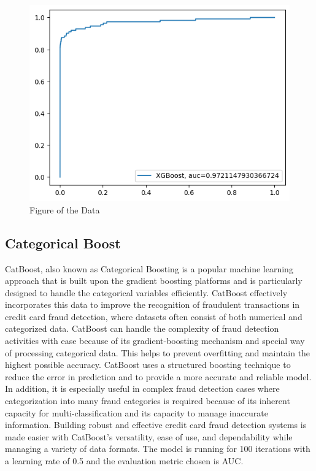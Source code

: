  \begin{figure}[ht]
    \centering
    \includegraphics[scale=0.7]{figures/XGBoost.png}
    \caption{Figure of the Data}
    \label{fig:Plot of the Data}
\end{figure}

\clearpage
 \subsection{Categorical Boost}

 CatBoost, also known as Categorical Boosting is a popular machine learning approach that is built upon the gradient boosting platforms and is particularly designed to handle the categorical variables efficiently. CatBoost effectively incorporates this data to improve the recognition of fraudulent transactions in credit card fraud detection, where datasets often consist of both numerical and categorized data. CatBoost can handle the complexity of fraud detection activities with ease because of its gradient-boosting mechanism and special way of processing categorical data. This helps to prevent overfitting and maintain the highest possible accuracy. CatBoost uses a structured boosting technique to reduce the error in prediction and to provide a more accurate and reliable model. In addition, it is especially useful in complex fraud detection cases where categorization into many fraud categories is required because of its inherent capacity for multi-classification and its capacity to manage inaccurate information. Building robust and effective credit card fraud detection systems is made easier with CatBoost's versatility, ease of use, and dependability while managing a variety of data formats. The model is running for 100 iterations with a learning rate of 0.5 and the evaluation metric chosen is AUC.

